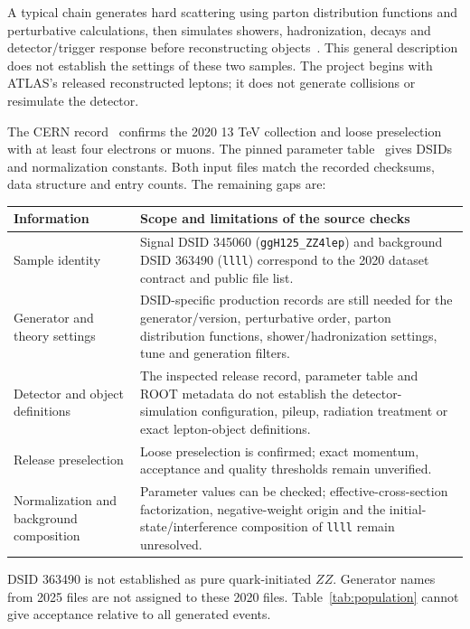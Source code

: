 \documentclass[11pt,a4paper]{article}
\begin{document}
A typical chain generates hard scattering using parton distribution functions and perturbative calculations, then simulates showers, hadronization, decays and detector/trigger response before reconstructing objects~\cite{ATLASSimulation}.
This general description does not establish the settings of these two samples.
The project begins with ATLAS's released reconstructed leptons; it does not generate collisions or resimulate the detector.

The CERN record~\cite{OpenData} confirms the 2020 13 TeV collection and loose preselection with at least four electrons or muons.
The pinned parameter table~\cite{SampleInfo} gives DSIDs and normalization constants. Both input files match the recorded checksums, data structure and entry counts.
The remaining gaps are:
\begin{center}
\small
\begin{tabularx}{\linewidth}{@{}>{\raggedright\arraybackslash}p{.23\linewidth}Y@{}}
\toprule
Information & Scope and limitations of the source checks \\
\midrule
Sample identity & Signal DSID 345060 (\texttt{ggH125\_ZZ4lep}) and background DSID 363490 (\texttt{llll}) correspond to the 2020 dataset contract and public file list. \\
Generator and theory settings & DSID-specific production records are still needed for the generator/version, perturbative order, parton distribution functions, shower/hadronization settings, tune and generation filters. \\
Detector and object definitions & The inspected release record, parameter table and ROOT metadata do not establish the detector-simulation configuration, pileup, radiation treatment or exact lepton-object definitions. \\
Release preselection & Loose preselection is confirmed; exact momentum, acceptance and quality thresholds remain unverified. \\
Normalization and background composition & Parameter values can be checked; effective-cross-section factorization, negative-weight origin and the initial-state/interference composition of \texttt{llll} remain unresolved. \\
\bottomrule
\end{tabularx}
\end{center}
DSID 363490 is not established as pure quark-initiated $ZZ$. Generator names from 2025 files are not assigned to these 2020 files.
Table~\ref{tab:population} cannot give acceptance relative to all generated events.
\end{document}
